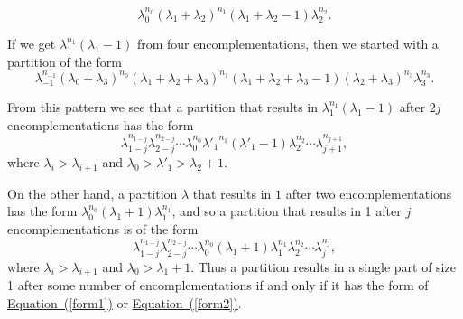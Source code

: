 \documentclass{book}
\begin{document}
\begin{activity}[]
\begin{equation*}
\lambda_0^{n_0}(\lambda_1+\lambda_{2})^{n_1}(\lambda_1+
\lambda_2-1)\lambda_2^{n_2}.
\end{equation*}
%
\par
\hypertarget{p-1563}{}%
If we get \(\lambda_1^{n_1}(\lambda_1-1)\) from four encomplementations, then we started with a partition of the form%
\begin{equation*}
\lambda_{-1}^{n_{-1}}(\lambda_0+\lambda_{3})^{n_0}(\lambda_1+
\lambda_2 +
\lambda_{3})^{n_1}(\lambda_1+\lambda_2 +\lambda_3-1)(\lambda_2+
\lambda_{3})^{n_3}
\lambda_3^{n_3}.
\end{equation*}
%
\par
\hypertarget{p-1564}{}%
From this pattern we see that a partition that results in \(\lambda_1^{n_1}(\lambda_1-1)\) after \(2j\) encomplementations has the form%
\begin{equation}
\lambda_{1-j}^{n_{1-j}}\lambda_{2-j}^{n_{2-j}}\cdots
\lambda_0^{n_0}
{\lambda'_1}^{n_1}
(\lambda'_1-1)\lambda_2^{n_2}\cdots
\lambda_{j+1}^{n_{j+1}},\label{form1}
\end{equation}
where \(\lambda_i>\lambda_{i+1}\) and \(\lambda_0>\lambda'_1>\lambda_2+1\).%
\par
\hypertarget{p-1565}{}%
On the other hand, a partition \(\lambda\) that results in \(1\) after two encomplementations has the form \(\lambda_0^{n_0}(\lambda_1+1)\lambda_1^{n_1}\), and so a partition that results in 1 after \(j\) encomplementations is of the form%
\begin{equation}
\lambda_{1-j}^{n_{1-j}}\lambda_{2-j}^{n_{2-j}}\cdots
\lambda_0^{n_0}(\lambda_1+1)\lambda_1^{n_1}\lambda_2^{n_2}\cdots
\lambda_j^{n_j},\label{form2}
\end{equation}
where \(\lambda_i>\lambda_{i+1}\) and \(\lambda_0>\lambda_1+1\). Thus a partition results in a single part of size 1 after some number of encomplementations if and only if it has the form of \hyperref[form1]{Equation~(\ref{form1})} or \hyperref[form2]{Equation~(\ref{form2})}.%
\end{activity}
\end{document}
